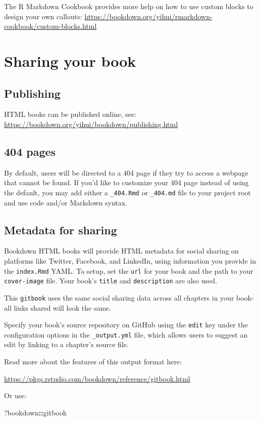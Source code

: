 \documentclass[
]{book}
\newenvironment{Shaded}{\begin{snugshade}}{\end{snugshade}}
\newcommand{\NormalTok}[1]{#1}
\newcommand{\SpecialCharTok}[1]{\textcolor[rgb]{0.81,0.36,0.00}{\textbf{#1}}}
\theoremstyle{definition}
\theoremstyle{definition}
\theoremstyle{definition}
\theoremstyle{definition}
\theoremstyle{remark}
\begin{document}
The R Markdown Cookbook provides more help on how to use custom blocks to design your own callouts: \url{https://bookdown.org/yihui/rmarkdown-cookbook/custom-blocks.html}

\chapter{Sharing your book}\label{sharing-your-book}

\section{Publishing}\label{publishing}

HTML books can be published online, see: \url{https://bookdown.org/yihui/bookdown/publishing.html}

\section{404 pages}\label{pages}

By default, users will be directed to a 404 page if they try to access a webpage that cannot be found. If you'd like to customize your 404 page instead of using the default, you may add either a \texttt{\_404.Rmd} or \texttt{\_404.md} file to your project root and use code and/or Markdown syntax.

\section{Metadata for sharing}\label{metadata-for-sharing}

Bookdown HTML books will provide HTML metadata for social sharing on platforms like Twitter, Facebook, and LinkedIn, using information you provide in the \texttt{index.Rmd} YAML. To setup, set the \texttt{url} for your book and the path to your \texttt{cover-image} file. Your book's \texttt{title} and \texttt{description} are also used.

This \texttt{gitbook} uses the same social sharing data across all chapters in your book- all links shared will look the same.

Specify your book's source repository on GitHub using the \texttt{edit} key under the configuration options in the \texttt{\_output.yml} file, which allows users to suggest an edit by linking to a chapter's source file.

Read more about the features of this output format here:

\url{https://pkgs.rstudio.com/bookdown/reference/gitbook.html}

Or use:

\begin{Shaded}
\begin{Highlighting}[]
\NormalTok{?bookdown}\SpecialCharTok{::}\NormalTok{gitbook}
\end{Highlighting}
\end{Shaded}


  
\end{document}

